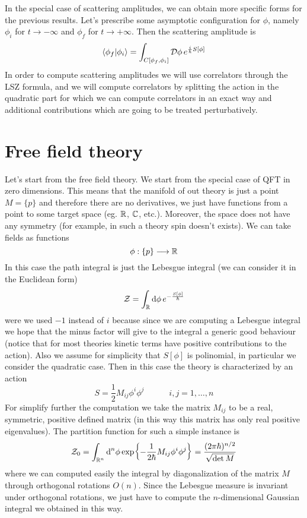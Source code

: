 \documentclass[../main/main.tex]{subfiles}
\begin{document}
In the special case of scattering amplitudes, we can obtain more specific forms for the previous results. Let's prescribe some asymptotic configuration for $\phi$, namely $\phi_i$ for $t\to-\infty$ and $\phi_f$ for $t\to+\infty$. Then the scattering amplitude is
\[\braket{\phi_f}{\phi_i}=\int_{C[\phi_f,\phi_i]}\mathcal D\phi\,e^{\frac i\hbar S[\phi]}\]
In order to compute scattering amplitudes we will use correlators through the LSZ formula, and we will compute correlators by splitting the action in the quadratic part for which we can compute correlators in an exact way and additional contributions which are going to be treated perturbatively. 


\section{Free field theory}

Let's start from the free field theory. We start from the special case of QFT in zero dimensions. This means that the manifold of out theory is just a point $M=\{p\}$ and therefore there are no derivatives, we just have functions from a point to some target space (eg. $\mathbb{R}$, $\mathbb{C}$, etc.). Moreover, the space does not have any symmetry (for example, in such a theory spin doesn't exists). We can take fields as functions
\[\phi:\{p\}\longrightarrow\mathbb{R}\]
In this case the path integral is just the Lebesgue integral (we can consider it in the Euclidean form)
\[\mathcal Z=\int_{\mathbb{R}}\textup{d}\phi\,e^{-\frac{S[\phi]}\hbar}\]
were we used $-1$ instead of $i$ because since we are computing a Lebesgue integral we hope that the minus factor will give to the integral a generic good behaviour (notice that for most theories kinetic terms have positive contributions to the action). Also we assume for simplicity that $S[\phi]$ is polinomial, in particular we consider the quadratic case. 
Then in this case the theory is characterized by an action
\[S=\frac12M_{ij}\phi^i\phi^j\qquad\quad i,j=1,\dots,n\]
For simplify further the computation we take the matrix $M_{ij}$ to be a real, symmetric, positive defined matrix (in this way this matrix has only real positive eigenvalues).
The partition function for such a simple instance is 
\[\mathcal Z_0=\int_{\mathbb{R}^n}\textup{d}^n\phi \exp{-\frac1{2\hbar}M_{ij}\phi^i\phi^j}=\frac{(2\pi\hbar)^{n/2}}{\sqrt{\det M}}\]
where we can computed easily the integral by diagonalization of the matrix $M$ through orthogonal rotations $O(n)$. Since the Lebesgue measure is invariant under orthogonal rotations, we just have to compute the $n$-dimensional Gaussian integral we obtained in this way. 
\end{document}
